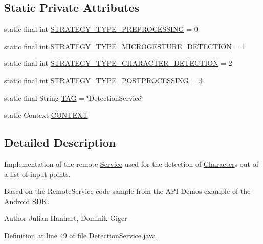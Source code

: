 \subsection*{Static Private Attributes}
\begin{DoxyCompactItemize}
\item 
static final int \hyperlink{classch_1_1zhaw_1_1ba10__bsha__1_1_1service_1_1DetectionService_a618391553bffc271f3d62fc4b1705c34}{STRATEGY\_\-TYPE\_\-PREPROCESSING} = 0
\item 
static final int \hyperlink{classch_1_1zhaw_1_1ba10__bsha__1_1_1service_1_1DetectionService_acc8c85d6fe896611e64180360f6150b3}{STRATEGY\_\-TYPE\_\-MICROGESTURE\_\-DETECTION} = 1
\item 
static final int \hyperlink{classch_1_1zhaw_1_1ba10__bsha__1_1_1service_1_1DetectionService_a79f9a08bcebfb07d97dad403931d011d}{STRATEGY\_\-TYPE\_\-CHARACTER\_\-DETECTION} = 2
\item 
static final int \hyperlink{classch_1_1zhaw_1_1ba10__bsha__1_1_1service_1_1DetectionService_a0a5532caf09d48e950372c1b0de3e328}{STRATEGY\_\-TYPE\_\-POSTPROCESSING} = 3
\item 
static final String \hyperlink{classch_1_1zhaw_1_1ba10__bsha__1_1_1service_1_1DetectionService_a94d1866b426bddfba5d001cc6bc003fa}{TAG} = \char`\"{}DetectionService\char`\"{}
\item 
static Context \hyperlink{classch_1_1zhaw_1_1ba10__bsha__1_1_1service_1_1DetectionService_a0e249aa466d4da8bcac9f75942129aa6}{CONTEXT}
\end{DoxyCompactItemize}


\subsection{Detailed Description}
Implementation of the remote \hyperlink{}{Service} used for the detection of \hyperlink{classch_1_1zhaw_1_1ba10__bsha__1_1_1Character}{Character}s out of a list of input points.

Based on the RemoteService code sample from the API Demos example of the Android SDK.

\begin{DoxyAuthor}{Author}
Julian Hanhart, Dominik Giger 
\end{DoxyAuthor}


Definition at line 49 of file DetectionService.java.

